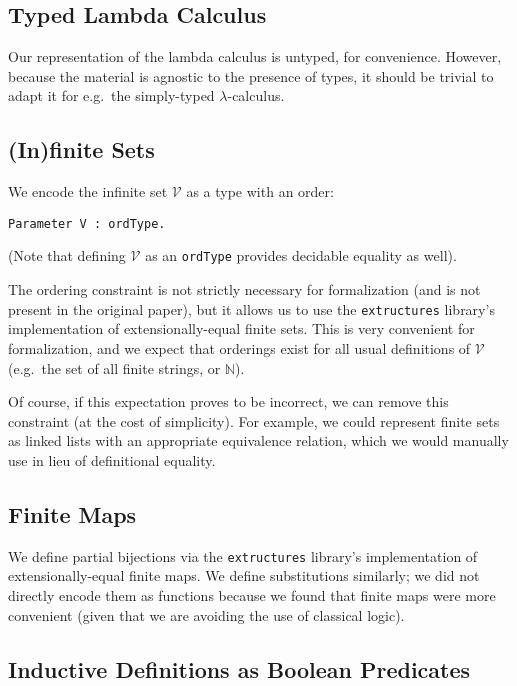 \documentclass{article}
\begin{document}
\subsection{Typed Lambda Calculus}

Our representation of the lambda calculus is untyped, for convenience. However, because the material
is agnostic to the presence of types, it should be trivial to adapt it for e.g.\ the simply-typed
$\lambda$-calculus.

\subsection{(In)finite Sets}

We encode the infinite set $\mathcal{V}$ as a type with an order:

\begin{verbatim}
Parameter V : ordType.
\end{verbatim}

(Note that defining $\mathcal{V}$ as an \verb|ordType| provides decidable equality as well).

The ordering constraint is not strictly necessary for formalization (and is not present in the
original paper), but it allows us to use the \verb|extructures| library's implementation of
extensionally-equal finite sets. This is very convenient for formalization, and we expect that
orderings exist for all usual definitions of $\mathcal{V}$ (e.g.\ the set of all finite strings, or
$\mathbb{N}$).

Of course, if this expectation proves to be incorrect, we can remove this constraint (at the cost of
simplicity). For example, we could represent finite sets as linked lists with an appropriate
equivalence relation, which we would manually use in lieu of definitional equality.

\subsection{Finite Maps}

We define partial bijections via the \verb|extructures| library's implementation of
extensionally-equal finite maps. We define substitutions similarly; we did not directly encode them
as functions because we found that finite maps were more convenient (given that we are avoiding the
use of classical logic).

\subsection{Inductive Definitions as Boolean Predicates}
\end{document}
